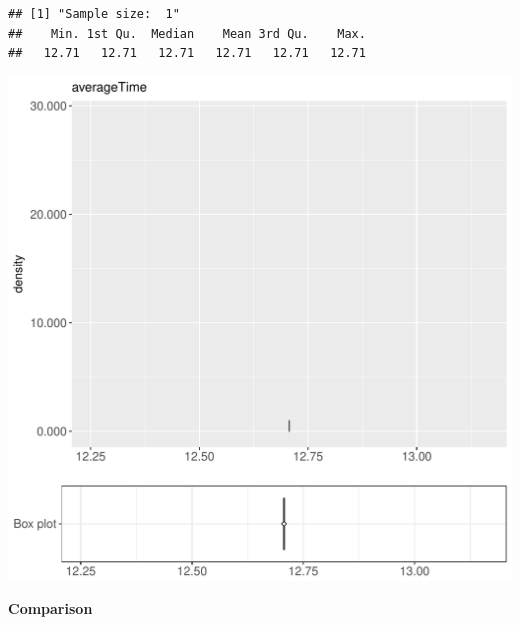\documentclass{article}\usepackage[]{graphicx}\usepackage[]{color}
\makeatletter
\def\maxwidth{ %
  \ifdim\Gin@nat@width>\linewidth
    \linewidth
  \else
    \Gin@nat@width
  \fi
}
\newenvironment{kframe}{%
 \def\at@end@of@kframe{}%
 \ifinner\ifhmode%
  \def\at@end@of@kframe{\end{minipage}}%
  \begin{minipage}{\columnwidth}%
 \fi\fi%
 \def\FrameCommand##1{\hskip\@totalleftmargin \hskip-\fboxsep
 \colorbox{shadecolor}{##1}\hskip-\fboxsep
     \hskip-\linewidth \hskip-\@totalleftmargin \hskip\columnwidth}%
 \MakeFramed {\advance\hsize-\width
   \@totalleftmargin\z@ \linewidth\hsize
   \@setminipage}}%
 {\par\unskip\endMakeFramed%
 \at@end@of@kframe}
\newenvironment{knitrout}{}{} %
\makeatother
\begin{document}
\begin{knitrout}
\color{fgcolor}\begin{kframe}
\begin{verbatim}
## [1] "Sample size:  1"
##    Min. 1st Qu.  Median    Mean 3rd Qu.    Max. 
##   12.71   12.71   12.71   12.71   12.71   12.71
\end{verbatim}


{\ttfamily\noindent\bfseries{}}\end{kframe}
\includegraphics[width=\maxwidth]{figure/RH1_noCache_big-1} 

\end{knitrout}
  
 \textbf{Comparison}
  
\end{document}
